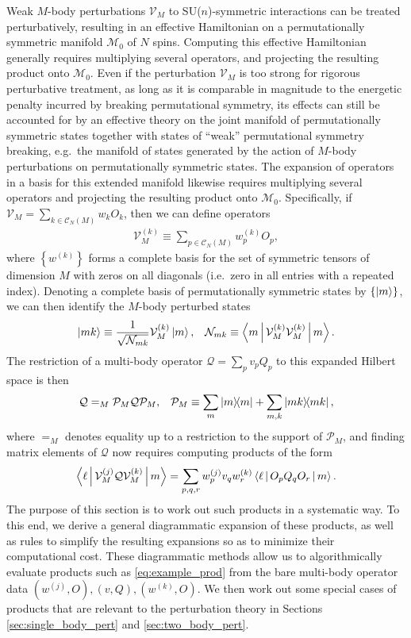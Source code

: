 \documentclass[nofootinbib,notitlepage,11pt]{revtex4-2}
\newcommand{\f}[2]{\dfrac{#1}{#2}} %
\newcommand{\p}[1]{\left(#1\right)} %
\renewcommand{\set}[1]{\left\{#1\right\}} %
\newcommand{\bk}{\Braket} %
\newcommand{\1}{\mathds{1}}
\newcommand{\C}{\mathcal{C}}
\newcommand{\M}{\mathcal{M}}
\newcommand{\N}{\mathcal{N}}
\renewcommand{\P}{\mathcal{P}}
\newcommand{\Q}{\mathcal{Q}}
\newcommand{\V}{\mathcal{V}}
\begin{document}
Weak $M$-body perturbations $\V_M$ to SU($n$)-symmetric interactions
can be treated perturbatively, resulting in an effective Hamiltonian
on a permutationally symmetric manifold $\M_0$ of $N$ spins.
Computing this effective Hamiltonian generally requires multiplying
several operators, and projecting the resulting product onto $\M_0$.
Even if the perturbation $\V_M$ is too strong for rigorous
perturbative treatment, as long as it is comparable in magnitude to
the energetic penalty incurred by breaking permutational symmetry, its
effects can still be accounted for by an effective theory on the joint
manifold of permutationally symmetric states together with states of
``weak'' permutational symmetry breaking, e.g.~the manifold of states
generated by the action of $M$-body perturbations on permutationally
symmetric states.  The expansion of operators in a basis for this
extended manifold likewise requires multiplying several operators and
projecting the resulting product onto $\M_0$.  Specifically, if
$\V_M=\sum_{k\in\C_N\p{M}}w_kO_k$, then we can define operators
\begin{align}
  \V_M^{(k)} \equiv \sum_{p\in\C_N\p{M}} w^{(k)}_p O_p,
\end{align}
where $\set{w^{(k)}}$ forms a complete basis for the set of symmetric
tensors of dimension $M$ with zeros on all diagonals (i.e.~zero in all
entries with a repeated index).  Denoting a complete basis of
permutationally symmetric states by $\set{\ket{m}}$, we can then
identify the $M$-body perturbed states
\begin{align}
  \ket{mk} \equiv \f1{\sqrt{\N_{mk}}} \V_M^{(k)} \ket{m},
  &&
  \N_{mk} \equiv \bk{m | \V_M^{(k)} \V_M^{(k)} | m}.
\end{align}
The restriction of a multi-body operator $\Q=\sum_p v_p Q_p$ to this
expanded Hilbert space is then
\begin{align}
  \Q =_M \P_M \Q \P_M,
  &&
  \P_M \equiv \sum_m \op{m} + \sum_{m,k} \op{mk},
\end{align}
where $=_M$ denotes equality up to a restriction to the support of
$\P_M$, and finding matrix elements of $\Q$ now requires computing
products of the form
\begin{align}
  \bk{\ell | \V_M^{(j)} \Q \V_M^{(k)} | m}
  = \sum_{p,q,r} w^{(j)}_p v_q w^{(k)}_r \bk{\ell | O_p Q_q O_r | m}.
  \label{eq:example_prod}
\end{align}
The purpose of this section is to work out such products in a
systematic way.  To this end, we derive a general diagrammatic
expansion of these products, as well as rules to simplify the
resulting expansions so as to minimize their computational cost.
These diagrammatic methods allow us to algorithmically evaluate
products such as \eqref{eq:example_prod} from the bare multi-body
operator data $\p{w^{(j)},O},\p{v,Q},\p{w^{(k)},O}$.  We then work out
some special cases of products that are relevant to the perturbation
theory in Sections \ref{sec:single_body_pert} and
\ref{sec:two_body_pert}.
\end{document}

